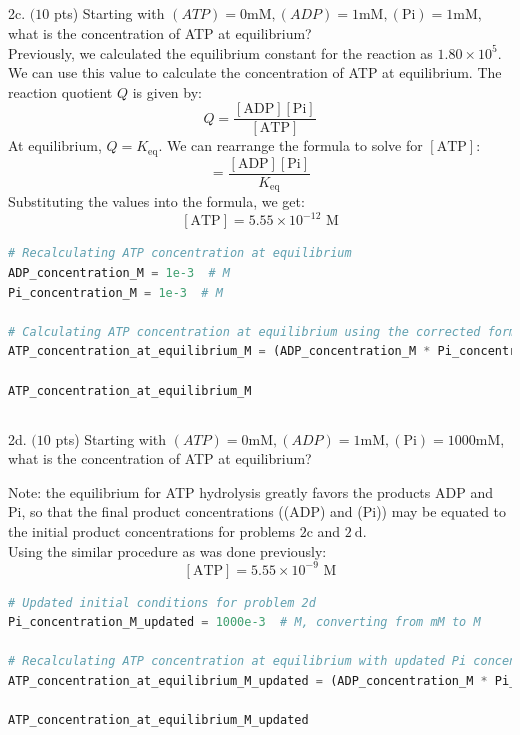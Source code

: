 \documentclass[12 pt]{article}
\begin{document}
\subsection{}
2c. $(10$ pts) Starting with $(A T P)=0 \mathrm{mM},(A D P)=1 \mathrm{mM},(\mathrm{Pi})=1 \mathrm{mM}$, what is the concentration of ATP at equilibrium?\\
Previously, we calculated the equilibrium constant for the reaction as $1.80 \times 10^{5}$. We can use this value to calculate the concentration of ATP at equilibrium. The reaction quotient $Q$ is given by:
\begin{equation}
  Q = \frac{[\text{ADP}] [\text{Pi}]}{[\text{ATP}]}
\end{equation}
At equilibrium, $Q = K_{\text{eq}}$. We can rearrange the formula to solve for $[\text{ATP}]$:
\begin{equation}
  [\text{ATP}] = \frac{[\text{ADP}] [\text{Pi}]}{K_{\text{eq}}}
\end{equation}
Substituting the values into the formula, we get:
\begin{equation}
\boxed{[\text{ATP}] = 5.55 \times 10^{-12} \text{ M}}
\end{equation}
\begin{lstlisting}[language=Python]
# Recalculating ATP concentration at equilibrium
ADP_concentration_M = 1e-3  # M
Pi_concentration_M = 1e-3  # M

# Calculating ATP concentration at equilibrium using the corrected formula
ATP_concentration_at_equilibrium_M = (ADP_concentration_M * Pi_concentration_M) / K_eq_value

ATP_concentration_at_equilibrium_M

\end{lstlisting}
\subsection{}
2d. $(10$ pts) Starting with $(A T P)=0 \mathrm{mM},(A D P)=1 \mathrm{mM},(\mathrm{Pi})=1000 \mathrm{mM}$, what is the concentration of ATP at equilibrium?

Note: the equilibrium for ATP hydrolysis greatly favors the products ADP and Pi, so that the final product concentrations ((ADP) and (Pi)) may be equated to the initial product concentrations for problems $2 \mathrm{c}$ and $2 \mathrm{~d}$.\\
Using the similar procedure as was done previously:
\begin{equation}
\boxed{[\text{ATP}] = 5.55 \times 10^{-9} \text{ M}}
\end{equation}
\begin{lstlisting}[language=Python]
# Updated initial conditions for problem 2d
Pi_concentration_M_updated = 1000e-3  # M, converting from mM to M

# Recalculating ATP concentration at equilibrium with updated Pi concentration
ATP_concentration_at_equilibrium_M_updated = (ADP_concentration_M * Pi_concentration_M_updated) / K_eq_value

ATP_concentration_at_equilibrium_M_updated

\end{lstlisting}
\end{document}
